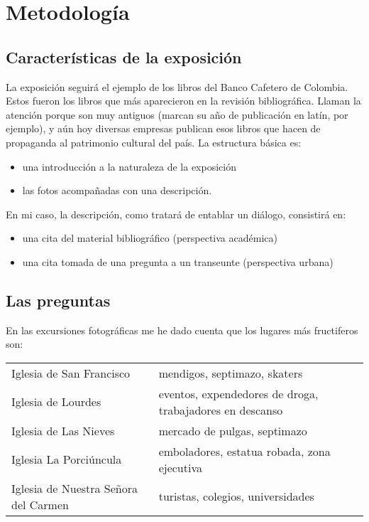 \documentclass[11pt]{article}
\begin{document}
\section{Metodología}
\label{sec-4}

\subsection{Características de la exposición}
\label{sec-4-1}
La exposición seguirá el ejemplo de los libros del Banco Cafetero de Colombia. Estos fueron los libros que más aparecieron en la revisión bibliográfica. 
Llaman la atención porque son muy antiguos (marcan su año de publicación en latín, por ejemplo), y aún hoy diversas empresas publican esos libros 
que hacen de propaganda al patrimonio cultural del país. La estructura básica es:

\begin{itemize}
\item una introducción a la naturaleza de la exposición
\item las fotos acompañadas con una descripción.
\end{itemize}

En mi caso, la descripción, como tratará de entablar un diálogo, consistirá en:

\begin{itemize}
\item una cita del material bibliográfico (perspectiva académica)
\item una cita tomada de una pregunta a un transeunte (perspectiva urbana)
\end{itemize}

\subsection{Las preguntas}
\label{sec-4-2}
En las excursiones fotográficas me he dado cuenta que los lugares más fructiferos son:

\begin{center}
\begin{tabular}{ll}
Iglesia de San Francisco & mendigos, septimazo, skaters\\
Iglesia de Lourdes & eventos, expendedores de droga, trabajadores en descanso\\
Iglesia de Las Nieves & mercado de pulgas, septimazo\\
Iglesia La Porciúncula & emboladores, estatua robada, zona ejecutiva\\
Iglesia de Nuestra Señora del Carmen & turistas, colegios, universidades\\
\end{tabular}
\end{center}
\end{document}
